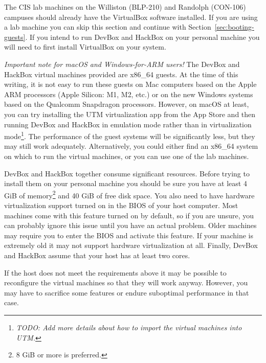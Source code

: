\documentclass{article}
\newcommand{\todo}[1]{\textit{TODO: #1}}
\begin{document}
The CIS lab machines on the Williston (BLP-210) and Randolph (CON-106) campuses should already
have the VirtualBox software installed. If you are using a lab machine you can skip this section
and continue with Section~\ref{sec:booting-guests}. If you intend to run DevBox and HackBox on
your personal machine you will need to first install VirtualBox on your system.

\textit{Important note for macOS and Windows-for-ARM users!} The DevBox and HackBox virtual
machines provided are x86\_64 guests. At the time of this writing, it is not easy to run these
guests on Mac computers based on the Apple ARM processors (Apple Silicon: M1, M2, etc.) or on
the new Windows systems based on the Qualcomm Snapdragon processors. However, on macOS at least,
you can try installing the UTM virtualization app from the App Store and then running DevBox and
HackBox in emulation mode rather than in virtualization mode\footnote{\todo{Add more details
about how to import the virtual machines into UTM.}}. The performance of the guest systems will
be significantly less, but they may still work adequately. Alternatively, you could either find
an x86\_64 system on which to run the virtual machines, or you can use one of the lab machines.

DevBox and HackBox together consume significant resources. Before trying to install them on your
personal machine you should be sure you have at least 4 GiB of memory\footnote{8 GiB or more is
preferred.} and 40 GiB of free disk space. You also need to have hardware virtualization support
turned on in the BIOS of your host computer. Most machines come with this feature turned on by
default, so if you are unsure, you can probably ignore this issue until you have an actual
problem. Older machines may require you to enter the BIOS and activate this feature. If your
machine is extremely old it may not support hardware virtualization at all. Finally, DevBox and
HackBox assume that your host has at least two cores.

If the host does not meet the requirements above it may be possible to reconfigure the virtual
machines so that they will work anyway. However, you may have to sacrifice some features or
endure suboptimal performance in that case.
\end{document}
